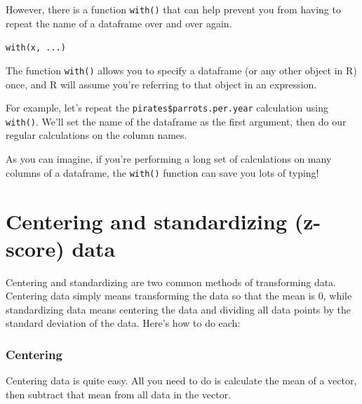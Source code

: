 \documentclass{tufte-book}\usepackage[]{graphicx}\usepackage[]{color}
\makeatletter
\newcommand{\hlopt}[1]{\textcolor[rgb]{0,0,0}{#1}}%
\newcommand{\hlstd}[1]{\textcolor[rgb]{0.345,0.345,0.345}{#1}}%
\newcommand{\hlkwb}[1]{\textcolor[rgb]{0.69,0.353,0.396}{#1}}%
\newcommand{\hlkwd}[1]{\textcolor[rgb]{0.737,0.353,0.396}{\textbf{#1}}}%
\newenvironment{kframe}{%
 \def\at@end@of@kframe{}%
 \ifinner\ifhmode%
  \def\at@end@of@kframe{\end{minipage}}%
  \begin{minipage}{\columnwidth}%
 \fi\fi%
 \def\FrameCommand##1{\hskip\@totalleftmargin \hskip-\fboxsep
 \colorbox{shadecolor}{##1}\hskip-\fboxsep
     \hskip-\linewidth \hskip-\@totalleftmargin \hskip\columnwidth}%
 \MakeFramed {\advance\hsize-\width
   \@totalleftmargin\z@ \linewidth\hsize
   \@setminipage}}%
 {\par\unskip\endMakeFramed%
 \at@end@of@kframe}
\newenvironment{knitrout}{}{} %
\newcommand{\newfun}[1]{\begin{LARGE} \begin{center} \texttt{#1} \end{center} \end{LARGE}}
\makeatother
\begin{document}
\begin{footnotesize}
However, there is a function \texttt{with()} that can help prevent you from having to repeat the name of a dataframe over and over again.

\newfun{with(x, ...)}


The function \texttt{with()} allows you to specify a dataframe (or any other object in R) once, and R will assume you're referring to that object in an expression.

For example, let's repeat the \texttt{pirates\$parrots.per.year} calculation using \texttt{with()}. We'll set the name of the dataframe as the first argument, then do our regular calculations on the column names.


As you can imagine, if you're performing a long set of calculations on many columns of a dataframe, the \texttt{with()} function can save you lots of typing!


\section{Centering and standardizing (z-score) data}

Centering and standardizing are two common methods of transforming data. Centering data simply means transforming the data so that the mean is 0, while standardizing data means centering the data and dividing all data points by the standard deviation of the data. Here's how to do each:

\subsubsection{Centering}

Centering data is quite easy. All you need to do is calculate the mean of a vector, then subtract that mean from all data in the vector.


\end{footnotesize}
\end{document}
